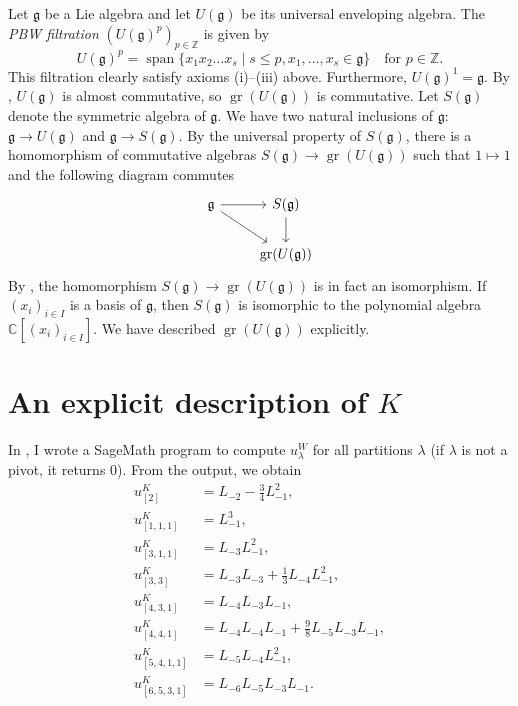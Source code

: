 \documentclass[a4paper, 12pt, reqno]{amsart}
\theoremstyle{remark}
\numberwithin{equation}{subsection}
\DeclareMathOperator{\gr}{gr}
\DeclareMathOperator{\vspan}{span}
\begin{document}
Let $\mathfrak{g}$ be a Lie algebra and let $U(\mathfrak{g})$ be its universal enveloping algebra.
The \emph{PBW filtration} $(U(\mathfrak{g})^p)_{p \in \mathbb{Z}}$ is given by
\begin{equation*}
  U(\mathfrak{g})^p = \vspan\{x_1x_2\dots x_s \mid s \le p, x_1, \dots, x_s \in \mathfrak{g}\} \quad \text{for }p \in \mathbb{Z}.
\end{equation*}
This filtration clearly satisfy axioms (i)--(iii) above.
Furthermore, $U(\mathfrak{g})^1 = \mathfrak{g}$.
By \cite[Lemma 2.1.5]{dixmier_enveloping_1996}, $U(\mathfrak{g})$ is almost commutative, so $\gr(U(\mathfrak{g}))$ is commutative.
Let $S(\mathfrak{g})$ denote the symmetric algebra of $\mathfrak{g}$.
We have two natural inclusions of $\mathfrak{g}$: $\mathfrak{g} \to U(\mathfrak{g})$ and $\mathfrak{g} \to S(\mathfrak{g})$.
By the universal property of $S(\mathfrak{g})$, there is a homomorphism of commutative algebras $S(\mathfrak{g}) \to \gr(U(\mathfrak{g}))$ such that $1 \mapsto 1$ and the following diagram commutes
\begin{equation*}
  \begin{tikzcd}
    \mathfrak{g} \arrow[r] \arrow[rd] & S(\mathfrak{g}) \arrow[d] \\
    & \gr(U(\mathfrak{g}))
  \end{tikzcd}
\end{equation*}
By \cite[Proposition 2.3.6]{dixmier_enveloping_1996}, the homomorphism $S(\mathfrak{g}) \to \gr(U(\mathfrak{g}))$ is in fact an isomorphism.
If $(x_i)_{i \in I}$ is a basis of $\mathfrak{g}$, then $S(\mathfrak{g})$ is isomorphic to the polynomial algebra $\mathbb{C}[(x_i)_{i \in I}]$.
We have described $\gr(U(\mathfrak{g}))$ explicitly.

\section{An explicit description of $K$}
\label{sec:an-expl-descr}

In \cite[ising-modules.ipynb]{sagemath2}, I wrote a SageMath program to compute $u^W_{\lambda}$ for all partitions $\lambda$ (if $\lambda$ is not a pivot, it returns $0$).
From the output, we obtain
\begin{align*}
  u^K_{[2]} &= L_{-2} - \tfrac{3}{4}L_{-1}^2, \\
  u^K_{[1, 1, 1]} &= L_{-1}^3, \\
  u^K_{[3, 1, 1]} &= L_{-3}L_{-1}^2, \\
  u^K_{[3, 3]} &= L_{-3}L_{-3} + \tfrac{1}{3}L_{-4}L_{-1}^2, \\
  u^K_{[4, 3, 1]} &= L_{-4}L_{-3}L_{-1}, \\
  u^K_{[4, 4, 1]} &= L_{-4}L_{-4}L_{-1} + \tfrac{9}{8}L_{-5}L_{-3}L_{-1}, \\
  u^K_{[5, 4, 1, 1]} &= L_{-5}L_{-4}L_{-1}^2, \\
  u^K_{[6, 5, 3, 1]} &= L_{-6}L_{-5}L_{-3}L_{-1}.
\end{align*}
\end{document}
